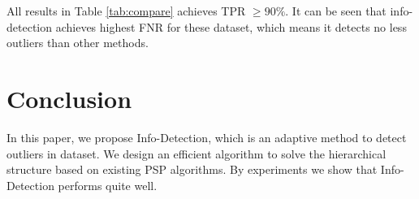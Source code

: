 \documentclass[runningheads]{llncs}
\begin{document}
All results in Table \ref{tab:compare} achieves TPR $\geq 90\%$. It can be seen that info-detection achieves highest FNR for these dataset, which means it detects no less outliers than other methods.

\section{Conclusion}
In this paper, we propose Info-Detection, which is an adaptive method to detect outliers in dataset. We design an efficient algorithm to solve the hierarchical structure based on existing PSP algorithms. By experiments we show that Info-Detection performs quite well.
%
%
%


%
\appendix
\end{document}
